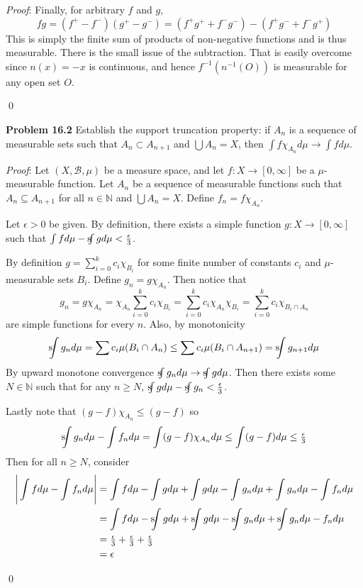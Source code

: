 \documentclass[12pt]{article}
\newcommand{\problem}[1]{\hspace{-4 ex} \large \textbf{Problem #1} }
\newcommand{\sint}{\text{s}\kern-5pt\int}
\renewenvironment{proof}{\hspace{-4 ex} \emph{Proof}:}{\qed}
\newcommand{\NN}{\mathbb{N}}
\newcommand{\BB}{\mathcal{B}}
\begin{document}
\begin{proof}
	Finally, for arbitrary $f$ and $g$, 
	$$
	fg = (f^+ - f^-)(g^+ - g^-) = (f^+g^+ + f^-g^-) - (f^+g^- + f^-g^+)
	$$
	This is simply the finite sum of products of non-negative functions and is thus measurable. There is the small issue of the subtraction. That is easily overcome since $n(x)=-x$ is continuous, and hence $f^{-1}(n^{-1}(O))$ is measurable for any open set $O$. 
	
\end{proof}


\bigbreak
\problem{16.2} Establish the support truncation property: if $A_n$ is a sequence of measurable sets such that $A_n\subset A_{n+1}$ and $\bigcup A_n=X$, then $\int f\chi_{A_n} d\mu\to\int f d\mu$.
\bigbreak

\begin{proof}
	Let $(X,\BB,\mu)$ be a measure space, and let $f:X \to [0,\infty]$ be a $\mu$-measurable function. Let $A_n$ be a sequence of measurable functions such that $A_n \subseteq A_{n+1}$ for all $n \in \NN$ and $\bigcup A_n = X$. Define $f_n = f\chi_{A_n}$. \bigbreak
	
	Let $\epsilon > 0$ be given. By definition, there exists a simple function $g:X \to [0,\infty]$ such that $\int f d\mu - \sint g d\mu < \tfrac{\epsilon}{3}$. \bigbreak
	
	By definition $g = \sum_{i=0}^k c_i \chi_{B_i}$ for some finite number of constants $c_i$ and $\mu$-measurable sets $B_i$. Define $g_n = g\chi_{A_n}$. Then notice that
	$$
	g_n = g\chi_{A_n} = \chi_{A_n} \sum_{i=0}^k c_i \chi_{B_i} =  \sum_{i=0}^k c_i \chi_{A_n} \chi_{B_i} = \sum_{i=0}^k c_i \chi_{B_i \cap A_n}
	$$
	are simple functions for every $n$. Also, by monotonicity
	$$
	\sint g_n d\mu = \sum c_i \mu(B_i \cap A_n) \leq \sum c_i \mu(B_i \cap A_{n+1}) = \sint g_{n+1} d\mu
	$$
	By upward monotone convergence $\sint g_n d\mu \to \sint g d\mu $. Then there exists some $N \in \NN$ such that for any $n \geq N$, $\sint g d\mu - \sint g_n < \tfrac{\epsilon}{3}$. \bigbreak
	
	Lastly note that $(g-f)\chi_{A_n} \leq (g-f)$ so 
	$$
	\sint g_n d\mu - \int f_n d\mu = \int(g-f)\chi_{A_n} d\mu \leq \int (g-f) d\mu \leq \tfrac{\epsilon}{3}
	$$
	Then for all $n \geq N$, consider
	\begin{align*}
		\Bigg \vert \int f d\mu - \int f_n d\mu \Bigg\vert 
		& = \int f d\mu - \int g d\mu + \int g d\mu - \int g_n d\mu + \int g_n d\mu - \int f_n d\mu \\
		& = \int f d\mu - \sint g d\mu + \sint g d\mu - \sint g_n d\mu + \sint g_n d\mu - f_n d\mu \\
		& = \tfrac{\epsilon}{3} + \tfrac{\epsilon}{3} + \tfrac{\epsilon}{3} \\
		& = \epsilon
	\end{align*}
	
\end{proof}
\end{document}
